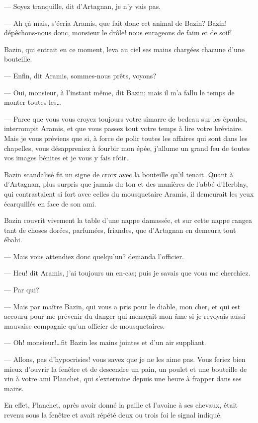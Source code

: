 — Soyez tranquille, dit d'Artagnan, je n'y vais pas.

— Ah çà mais, s'écria Aramis, que fait donc cet animal de Bazin? Bazin! dépêchons-nous donc, monsieur le drôle! nous enrageons de faim et de soif!

Bazin, qui entrait en ce moment, leva au ciel ses mains chargées chacune d'une bouteille.

— Enfin, dit Aramis, sommes-nous prêts, voyons?

— Oui, monsieur, à l'instant même, dit Bazin; mais il m'a fallu le temps de monter toutes les\dots

— Parce que vous vous croyez toujours votre simarre de bedeau sur les épaules, interrompit Aramis, et que vous passez tout votre temps à lire votre bréviaire. Mais je vous préviens que si, à force de polir toutes les affaires qui sont dans les chapelles, vous désappreniez à fourbir mon épée, j'allume un grand feu de toutes vos images bénites et je vous y fais rôtir.

Bazin scandalisé fit un signe de croix avec la bouteille qu'il tenait. Quant à d'Artagnan, plus surpris que jamais du ton et des manières de l'abbé d'Herblay, qui contrastaient si fort avec celles du mousquetaire Aramis, il demeurait les yeux écarquillés en face de son ami.

Bazin couvrit vivement la table d'une nappe damassée, et sur cette nappe rangea tant de choses dorées, parfumées, friandes, que d'Artagnan en demeura tout ébahi.

— Mais vous attendiez donc quelqu'un? demanda l'officier.

— Heu! dit Aramis, j'ai toujours un en-cas; puis je savais que vous me cherchiez.

— Par qui?

— Mais par maître Bazin, qui vous a pris pour le diable, mon cher, et qui est accouru pour me prévenir du danger qui menaçait mon âme si je revoyais aussi mauvaise compagnie qu'un officier de mousquetaires.

— Oh! monsieur!\dots fit Bazin les mains jointes et d'un air suppliant.

— Allons, pas d'hypocrisies! vous savez que je ne les aime pas. Vous feriez bien mieux d'ouvrir la fenêtre et de descendre un pain, un poulet et une bouteille de vin à votre ami Planchet, qui s'extermine depuis une heure à frapper dans ses mains.

En effet, Planchet, après avoir donné la paille et l'avoine à ses chevaux, était revenu sous la fenêtre et avait répété deux ou trois foi le signal indiqué.

